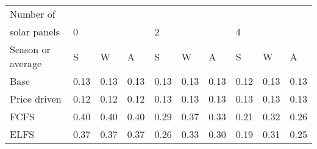 \begin{table}[h] 
\centering 
\begin{tabular}{l|lll|lll|lll}Number of \\ solar panels&0& & &2& & &4& & \\ \hline 
Season or average & S & W & A & S & W & A & S & W & A \\ \hline 
Base&0.13&0.13&0.13&0.13&0.13&0.13&0.12&0.13&0.13 \\ 
Price driven&0.12&0.12&0.12&0.13&0.13&0.13&0.13&0.13&0.13 \\ 
FCFS&0.40&0.40&0.40&0.29&0.37&0.33&0.21&0.32&0.26 \\ 
ELFS&0.37&0.37&0.37&0.26&0.33&0.30&0.19&0.31&0.25 \\ 
\end{tabular} 
\end{table}